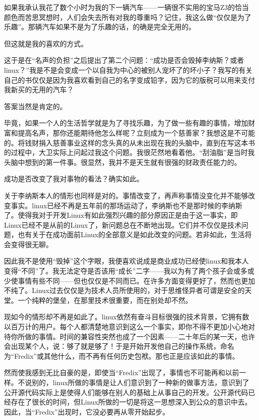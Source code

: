 如果我承认我花了数个小时为我的下一辆汽车——一辆很不实用的宝马Z3的恰当颜色而苦思冥想时，人们会失去所有对我的尊重吗？记住，我这么做“仅仅是为了乐趣”。那辆汽车如果不是为了乐趣的话，的确是完全无用的。

但这就是我的喜欢的方式。

这于是在“名声的负担”之后提出了第二个问题：“成功是否会毁掉李纳斯？或者linux？”我是不是会变成一个以自我为中心的被别人宠坏了的坏小子？我写的有关自己的书仅仅是因为我喜欢看到自己的名字变成铅字，因为它的版税可以用来支付我新买的无用的汽车？

答案当然是肯定的。

毕竟，如果一个人的生活哲学就是为了寻找乐趣，为了做一些有趣的事情，增加财富和提高名声，那你还能期待他怎么样呢？立刻成为一个慈善家？我想这是不可能的。将钱财捐入慈善事业这样的念头真的从未出现在我的头脑中，直到在写这本书的过程中，大卫实际上问起过我这个问题。我很茫然地看着他。“刮油脂”是当时我头脑中想到的第一件事。很显然，我并不是天生就有很强的财政责任能力的。

成功是否改变了我对事物的看法？确实如此。

关于李纳斯本人的情形也同样是对的。事情改变了，再声称事情没变化并不能够改变事实。linux已经不再是五年前的那场运动了，李纳斯也不是那时候的李纳斯了。使得我对于开发Linux有如此强烈兴趣的部分原因正是由于这一事实，即Linux已经不是从前的Linux了，新问题总在不断地出现。它们并不仅仅是技术问题，也有关于在成功面前Linux的全部意义是如此改变的问题。若非如此，生活将会变得很无聊。

因此我不是使用“毁掉”这个字眼，我便喜欢说成是商业成功已经使linux和我本人变得“不同”了。我无法定夺是否该用“成长”二字——我以为有了两个孩子会或多或少使事情有些不同——但也仅仅是不同而已。在许多方面变得更好了，然而也更加不纯了。Linux过去仅仅是为技术人员所使用的，对于思维怪异者可谓是安全的天堂。一个纯粹的堡垒，在那里技术很重要，而在别处却不然。

现如今的情形却不再是如此了。linux依然有奋斗目标很强的技术背景，它拥有数以百万计的用户。每个人都清楚地意识到这么一个事实，即你不得不更加小心地对待你所做的事情。时间的兼容性突然也成了一个因素——二十年后的某一天，也许会出现某个人，说：够了就是够了！于是开始开发他自己的操作系统，命名为“Fredix”或其他什么，而不再有任何历史包袱。那也正是应该如此的事情。

然而使我感到无比自豪的是，即使当“Fredix”出现了，事情也不可能再和以前一样。不说别的，linux所做的事情是让人们意识到了一种新的做事方法，意识到了公开源代码实际上是使得人们能够在别人的基础上从事自己的开发。公开源代码已经存在了很长的时间，但Linux所做的一切是将这一思想深入到公众的意识中去。因此，当“Fredix”出现时，它没必要再从零开始起步。

